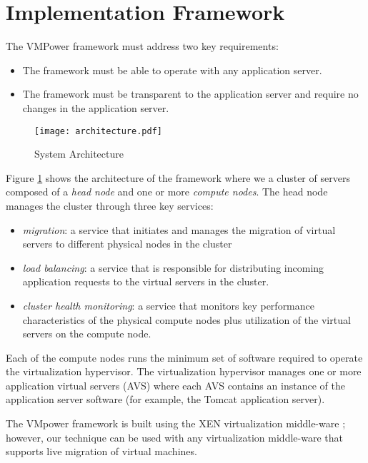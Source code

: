 \documentclass[times, 10pt,twocolumn]{article}
\begin{document}
\section{Implementation Framework}
\label{sec:system}
The VMPower framework must address two key requirements:
\begin{itemize}
\item The framework must be able to operate with any application server.
\item The framework must be transparent to the application server and require
  no changes in the application server.
\end{itemize}
\begin{figure}[h]
 	\centering
	\texttt{[image: architecture.pdf]}
   	\caption{System Architecture}
  	\label{architecture}
\end{figure}
Figure \ref{architecture} shows the architecture of the framework where we
a cluster of servers composed of a \textit{head node} and one or more
\textit{compute nodes}.  The head node manages the cluster through three key
services:
\begin{itemize}
\item \textit{migration}: a service that initiates and manages the migration of
  virtual servers to different physical nodes in the cluster
\item \textit{load balancing}: a service that is responsible for distributing
  incoming application requests to the virtual servers in the cluster.
\item \textit{cluster health monitoring}: a service that monitors key
  performance characteristics of the physical compute nodes plus utilization
  of the virtual servers on the compute node.
\end{itemize}
Each of the compute nodes runs the minimum set of software required to operate
the virtualization hypervisor.  The virtualization hypervisor manages one or
more application virtual servers (AVS) where each AVS contains an instance of
the application server software (for example, the Tomcat application server).

The VMpower framework is built using the XEN virtualization middle-ware
\cite{Abels2005}\cite{Barham2003}\cite{Chisnall2007}; however, our
technique can be used with any virtualization middle-ware that supports
live migration of virtual machines.
\end{document}
